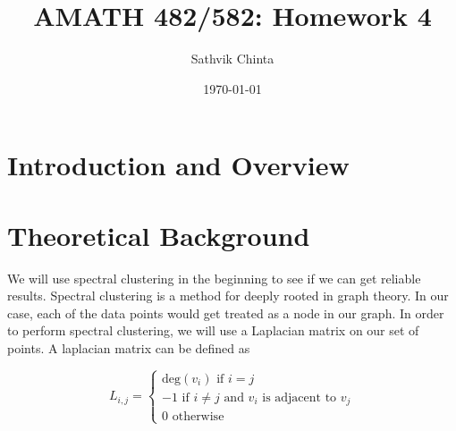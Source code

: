 \documentclass[11pt]{amsart}
\title{AMATH 482/582: Homework 4}
\author{Sathvik Chinta} %
\date{\today} %
\begin{document}
\maketitle 

\begin{abstract}
     
\end{abstract}


\section{Introduction and Overview}\label{sec:Introduction}



\section{Theoretical Background}\label{sec:theory}

We will use spectral clustering in the beginning to see 
if we can get reliable results. Spectral clustering is a
method for deeply rooted in graph theory. In our case, each of the 
data points would get treated as a node in our graph. In order to perform spectral clustering, 
we will use a Laplacian matrix on our set of points. A laplacian matrix can be defined as 

\begin{equation*}
    L_{i,j} = 
    \begin{cases}
      \text{deg}(v_i) \text{ if } i = j\\      
      -1 \text{ if } i \neq j \text{ and } v_i \text{ is adjacent to } v_j\\
      0 \text{ otherwise }
    \end{cases}
\end{equation*}
\end{document}
